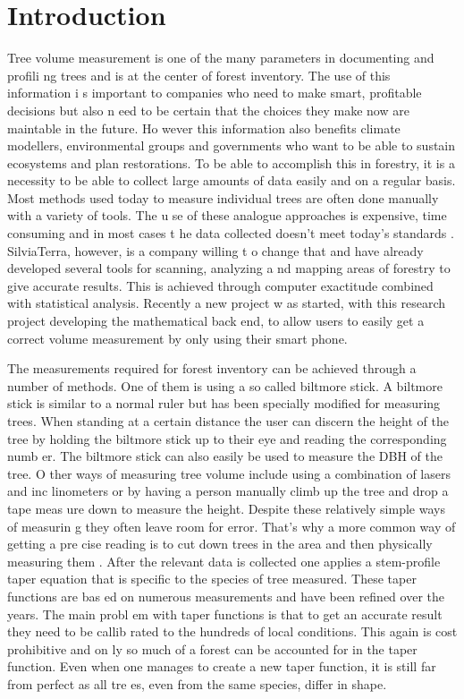 

\newcommand{\degree}{$^\circ$}

\section{Introduction}
Tree volume measurement is one of the many parameters in documenting and profili
ng trees and is at the center of forest inventory. The use of this information i
s important to companies who need to make smart, profitable decisions but also n
eed to be certain that the choices they make now are maintable in the future. Ho
wever this information also benefits climate modellers, environmental groups and
 governments who want to be able to sustain ecosystems and plan restorations. To
 be able to accomplish this in forestry, it is a necessity to be able to collect
 large amounts of data easily and on a regular basis. Most methods used today to
 measure individual trees are often done manually with a variety of tools. The u
se of these analogue approaches is expensive, time consuming and in most cases t
he data collected doesn't meet today's standards \cite{digital imaged based tree
 measurement for forest inventory}. SilviaTerra, however, is a company willing t
o change that and have already developed several tools for scanning, analyzing a
nd mapping areas of forestry to give accurate results. This is achieved through 
computer exactitude combined with statistical analysis. Recently a new project w
as started, with this research project developing the mathematical back end, to 
allow users to easily get a correct volume measurement by only using their smart
 phone.

The measurements required for forest inventory can be achieved through a number 
of methods. One of them is using a so called biltmore stick. A biltmore stick is
 similar to a normal ruler but has been specially modified for measuring trees. 
When standing at a certain distance the user can discern the height of the tree 
by holding the biltmore stick up to their eye and reading the corresponding numb
er. The biltmore stick can also easily be used to measure the DBH of the tree. O
ther ways of measuring tree volume include using a combination of lasers and inc
linometers or by having a person manually climb up the tree and drop a tape meas
ure down to measure the height. Despite these relatively simple ways of measurin
g they often leave room for error. That’s why a more common way of getting a pre
cise reading is to cut down trees in the area and then physically measuring them
. After the relevant data is collected one applies a stem-profile taper equation
 that is specific to the species of tree measured. These taper functions are bas
ed on numerous measurements and have been refined over the years. The main probl
em with taper functions is that to get an accurate result they need to be callib
rated to the hundreds of local conditions. This again is cost prohibitive and on
ly so much of a forest can be accounted for in the taper function. Even when one
 manages to create a new taper function, it is still far from perfect as all tre
es, even from the same species, differ in shape.

